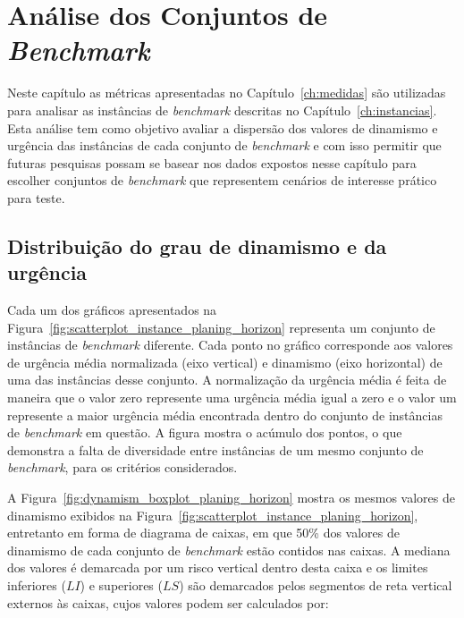 \chapter{Análise dos Conjuntos de \textit{Benchmark}}\label{ch:analise}

Neste capítulo as métricas apresentadas no Capítulo~\ref{ch:medidas} são 
utilizadas para analisar as instâncias de \textit{benchmark} descritas no
Capítulo~\ref{ch:instancias}. 
Esta análise tem como objetivo avaliar a dispersão dos valores de dinamismo e 
urgência das instâncias de cada conjunto de \textit{benchmark} e com isso 
permitir que futuras pesquisas possam se basear nos
dados expostos nesse capítulo para escolher conjuntos de \textit{benchmark} que
representem cenários de interesse prático para teste.






\section{Distribuição do grau de dinamismo e da urgência}

Cada um dos gráficos apresentados na 
Figura~\ref{fig:scatterplot_instance_planing_horizon} representa um conjunto 
de instâncias de \textit{benchmark} diferente. 
Cada ponto no gráfico corresponde aos valores de urgência média normalizada 
(eixo vertical) e dinamismo (eixo horizontal) de uma das instâncias desse 
conjunto.
A normalização da urgência média é feita de maneira que o valor zero represente
uma urgência média igual a zero e o valor um represente a maior urgência média
encontrada dentro do conjunto de instâncias de \textit{benchmark} em questão.
A figura mostra o acúmulo dos pontos, o que demonstra a falta
de diversidade entre instâncias de um mesmo conjunto de \textit{benchmark},
para os critérios considerados.


A Figura~\ref{fig:dynamism_boxplot_planing_horizon} mostra os mesmos valores de
dinamismo exibidos na Figura~\ref{fig:scatterplot_instance_planing_horizon}, 
entretanto em forma de diagrama de caixas, em que 50\% dos valores de dinamismo
de cada conjunto de \textit{benchmark} estão contidos nas caixas.
A mediana dos valores é demarcada por um risco vertical dentro desta caixa e os
limites inferiores ($LI$) e superiores ($LS$) são demarcados pelos segmentos 
de reta vertical externos às caixas, cujos valores podem ser calculados 
por:


